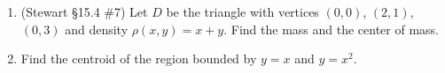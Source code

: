 \documentclass[12pt]{article}
\begin{document}
\begin{enumerate}
\begin{enumerate}
\begin{center}
        \end{center}
        \item (Stewart \S15.4 \#7) Let $D$ be the triangle with vertices $(0,0)$, $(2,1)$, $(0,3)$ and density $\rho(x,y) = x+y$. Find the mass and the center of mass.
        \item Find the centroid of the region bounded by $y=x$ and $y=x^2$.
    \end{enumerate}
\bigskip


\end{enumerate}
\end{document}
